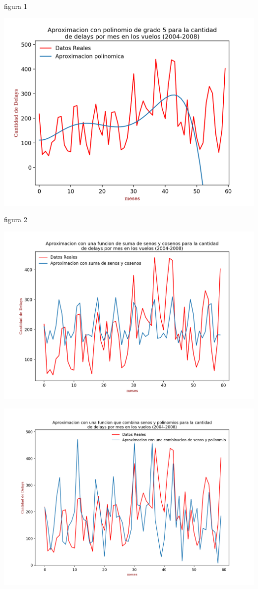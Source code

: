 \documentclass{endm}
\begin{document}
	\begin{center}
	\caption{figura 1}
	\includegraphics[scale=0.7]{imagenes/delaysPolinomio.png}
	\end{center}

	\begin{center}
	\caption{figura 2}
	\includegraphics[scale=0.6]{imagenes/senosCosenos.png}
	\end{center}

	\begin{center}
	\includegraphics[scale=0.5]{imagenes/polinomioysenos.png}
	\end{center}
\end{document}
